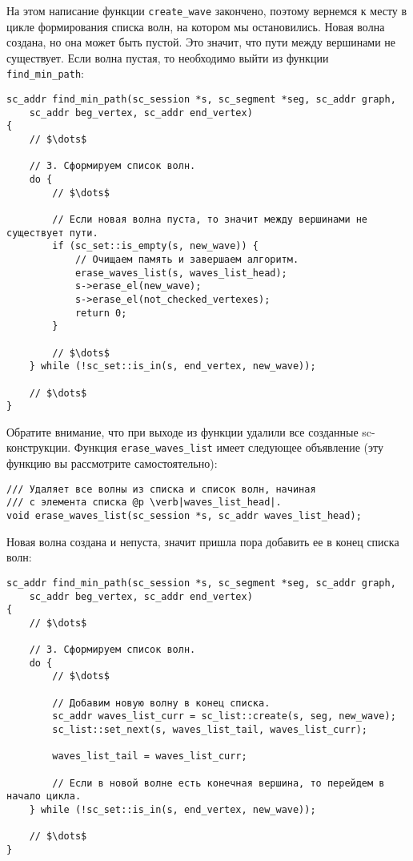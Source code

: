 На этом написание функции \lstinline|create_wave| закончено, поэтому
вернемся к месту в цикле формирования списка волн, на котором мы
остановились. Новая волна создана, но она может быть пустой. Это
значит, что пути между вершинами не существует. Если волна пустая, то
необходимо выйти из функции \lstinline|find_min_path|:
\begin{lstlisting}[texcl]
sc_addr find_min_path(sc_session *s, sc_segment *seg, sc_addr graph,
    sc_addr beg_vertex, sc_addr end_vertex)
{
    // $\dots$

    // 3. Сформируем список волн.
    do {
        // $\dots$

        // Если новая волна пуста, то значит между вершинами не существует пути.
        if (sc_set::is_empty(s, new_wave)) {
            // Очищаем память и завершаем алгоритм.
            erase_waves_list(s, waves_list_head);
            s->erase_el(new_wave);
            s->erase_el(not_checked_vertexes);
            return 0;
        }

        // $\dots$
    } while (!sc_set::is_in(s, end_vertex, new_wave));

    // $\dots$
}
\end{lstlisting}

Обратите внимание, что при выходе из функции удалили все созданные
sc-конструкции. Функция \lstinline|erase_waves_list| имеет следующее
объявление (эту функцию вы рассмотрите самостоятельно):
\begin{lstlisting}[texcl]
/// Удаляет все волны из списка и список волн, начиная
/// с элемента списка @p \verb|waves_list_head|.
void erase_waves_list(sc_session *s, sc_addr waves_list_head);
\end{lstlisting}

Новая волна создана и непуста, значит пришла пора добавить ее в конец
списка волн:
\begin{lstlisting}[texcl]
sc_addr find_min_path(sc_session *s, sc_segment *seg, sc_addr graph,
    sc_addr beg_vertex, sc_addr end_vertex)
{
    // $\dots$

    // 3. Сформируем список волн.
    do {
        // $\dots$

        // Добавим новую волну в конец списка.
        sc_addr waves_list_curr = sc_list::create(s, seg, new_wave);
        sc_list::set_next(s, waves_list_tail, waves_list_curr);

        waves_list_tail = waves_list_curr;

        // Если в новой волне есть конечная вершина, то перейдем в начало цикла.
    } while (!sc_set::is_in(s, end_vertex, new_wave));

    // $\dots$
}
\end{lstlisting}

